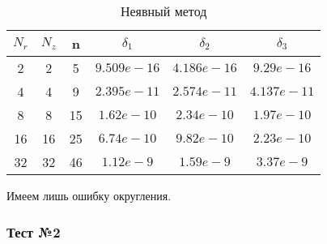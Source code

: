 \begin{table}[H]
  \begin{center}
    \begin{tabular}{*{6}c}
      \toprule
      $ N_r $ & $ N_z $ & n & $ \delta_1 $ & $ \delta_2 $ & $ \delta_3 $ \\
      \midrule
      2 & 2 & 5 & $ 9.509e-16 $ & $ 4.186e-16 $ & $ 9.29e-16 $ \\
      4 & 4 & 9 & $2.395e-11 $ & $2.574e-11 $ & $4.137e-11 $ \\
      8 & 8 & 15 & $ 1.62e-10 $ & $2.34e-10 $ & $1.97e-10 $ \\
      16 & 16 & 25 & $6.74e-10$ & $9.82e-10 $ & $2.23e-10 $ \\
      32 & 32 & 46 & $1.12e-9 $ & $1.59e-9 $ & $3.37e-9 $ \\
      \bottomrule
    \end{tabular}
    \caption{Неявный метод}
  \end{center}
\end{table}

Имеем лишь ошибку округления.

\subsubsection{Тест №2}